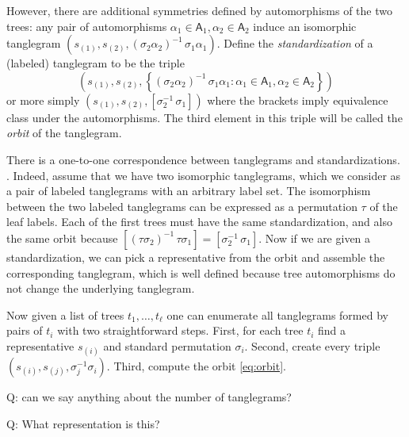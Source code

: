 \documentclass{amsart}
\newcommand{\aut}{\mathsf A}
\begin{document}
However, there are additional symmetries defined by automorphisms of the two trees: any pair of automorphisms $\alpha_1 \in \aut_1, \alpha_2 \in \aut_2$ induce an isomorphic tanglegram $(s_{(1)}, s_{(2)}, \left(\sigma_2 \alpha_2 \right)^{-1} \, \sigma_1 \alpha_1)$.
Define the \emph{standardization} of a (labeled) tanglegram to be the triple
\begin{equation}
\label{eq:orbit}
\left(s_{(1)}, s_{(2)}, \left\{(\sigma_2 \alpha_2)^{-1} \, \sigma_1 \alpha_1 : \alpha_1 \in \aut_1, \alpha_2 \in \aut_2  \right\}\right)
\end{equation}
or more simply $(s_{(1)}, s_{(2)}, [\sigma_2^{-1} \, \sigma_1])$ where the brackets imply equivalence class under the automorphisms.
The third element in this triple will be called the \emph{orbit} of the tanglegram.

There is a one-to-one correspondence between tanglegrams and standardizations.
.
Indeed, assume that we have two isomorphic tanglegrams, which we consider as a pair of labeled tanglegrams with an arbitrary label set.
The isomorphism between the two labeled tanglegrams can be expressed as a permutation $\tau$ of the leaf labels.
Each of the first trees must have the same standardization, and also the same orbit because $[\left(\tau \sigma_2\right)^{-1} \, \tau \sigma_1] = [\sigma_2^{-1} \, \sigma_1]$.
Now if we are given a standardization, we can pick a representative from the orbit and assemble the corresponding tanglegram, which is well defined because tree automorphisms do not change the underlying tanglegram.

Now given a list of trees $t_1, \ldots, t_\ell$ one can enumerate all tanglegrams formed by pairs of $t_i$ with two straightforward steps.
First, for each tree $t_i$ find a representative $s_{(i)}$ and standard permutation $\sigma_i$.
Second, create every triple $(s_{(i)}, s_{(j)}, \sigma_j^{-1} \sigma_i)$.
Third, compute the orbit \eqref{eq:orbit}.

Q: can we say anything about the number of tanglegrams?


Q: What representation is this?




\end{document}
